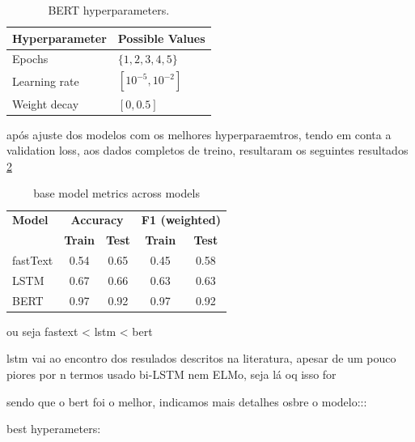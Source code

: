 \documentclass[conference]{IEEEtran}
\begin{document}
\begin{table}[H]
\begin{subtable}[t]{0.45\textwidth}
        \label{parameters_baselstm}
    \end{subtable}
    \begin{subtable}[t]{0.45\textwidth}
        \centering
        \begin{tabular}{ll}
        \toprule
        \textbf{Hyperparameter} & \textbf{Possible Values} \\
        \midrule
        Epochs \phantom{abcng disnsin} & $\{1,2,3,4,5\}$ \phantom{onds} \\
        Learning rate & $[10^{-5}, 10^{-2}]$ \\
        Weight decay & $[0, 0.5]$ \\
        \bottomrule
        \end{tabular}
        \vspace{.3em}
        \caption{BERT hyperparameters.}
        \label{parameters_basebert}
    \end{subtable}
\end{table}


após ajuste dos modelos com os melhores hyperparaemtros, tendo em conta a validation loss, aos dados completos de treino, resultaram os seguintes resultados \ref{basemodel_models}

\begin{table}[H]
\centering
\caption{base model metrics across models}
\label{basemodel_models}
\begin{tabular}{lcccc}
\toprule
\textbf{Model} & \multicolumn{2}{c}{\textbf{Accuracy}} & \multicolumn{2}{c}{\textbf{F1 (weighted)}} \\
\cmidrule(lr){2-3} \cmidrule(lr){4-5}
 & \textbf{Train} & \textbf{Test} & \textbf{Train} & \textbf{Test} \\
\midrule
fastText & 0.54 & 0.65 & 0.45 & 0.58 \\
LSTM & 0.67 & 0.66 & 0.63 & 0.63 \\
BERT & 0.97 & 0.92 & 0.97 & 0.92 \\
\bottomrule
\end{tabular}
\end{table}

ou seja fastext < lstm < bert

lstm vai ao encontro dos resulados descritos na literatura, apesar de um pouco piores por n termos usado bi-LSTM nem ELMo, seja lá oq isso for

sendo que o bert foi o melhor, indicamos mais detalhes osbre o modelo:::

best hyperameters: 
\end{document}
